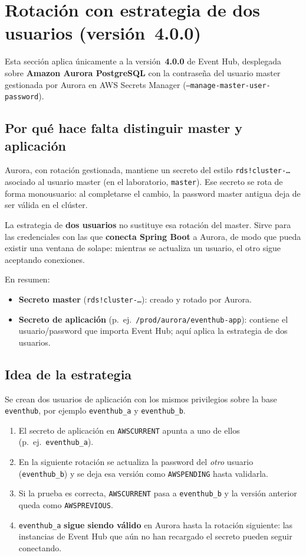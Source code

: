 \section{Rotación con estrategia de dos usuarios (versión~4.0.0)}

Esta sección aplica únicamente a la versión~\textbf{4.0.0} de Event Hub, desplegada sobre \textbf{Amazon Aurora PostgreSQL} con la contraseña del usuario master gestionada por Aurora en AWS Secrets Manager (\texttt{--manage-master-user-password}).

\subsection{Por qué hace falta distinguir master y aplicación}

Aurora, con rotación gestionada, mantiene un secreto del estilo \texttt{rds!cluster-\ldots} asociado al usuario master (en el laboratorio, \texttt{master}). Ese secreto se rota de forma monousuario: al completarse el cambio, la password master antigua deja de ser válida en el clúster.

La estrategia de \textbf{dos usuarios} no sustituye esa rotación del master. Sirve para las credenciales con las que \textbf{conecta Spring Boot} a Aurora, de modo que pueda existir una ventana de solape: mientras se actualiza un usuario, el otro sigue aceptando conexiones.

En resumen:

\begin{itemize}
    \item \textbf{Secreto master} (\texttt{rds!cluster-\ldots}): creado y rotado por Aurora.
    \item \textbf{Secreto de aplicación} (p.~ej.\ \texttt{/prod/aurora/eventhub-app}): contiene el usuario/password que importa Event Hub; aquí aplica la estrategia de dos usuarios.
\end{itemize}

\subsection{Idea de la estrategia}

Se crean dos usuarios de aplicación con los mismos privilegios sobre la base \texttt{eventhub}, por ejemplo \texttt{eventhub\_a} y \texttt{eventhub\_b}.

\begin{enumerate}
    \item El secreto de aplicación en \texttt{AWSCURRENT} apunta a uno de ellos (p.~ej.\ \texttt{eventhub\_a}).
    \item En la siguiente rotación se actualiza la password del \emph{otro} usuario (\texttt{eventhub\_b}) y se deja esa versión como \texttt{AWSPENDING} hasta validarla.
    \item Si la prueba es correcta, \texttt{AWSCURRENT} pasa a \texttt{eventhub\_b} y la versión anterior queda como \texttt{AWSPREVIOUS}.
    \item \texttt{eventhub\_a} \textbf{sigue siendo válido} en Aurora hasta la rotación siguiente: las instancias de Event Hub que aún no han recargado el secreto pueden seguir conectando.
\end{enumerate}

